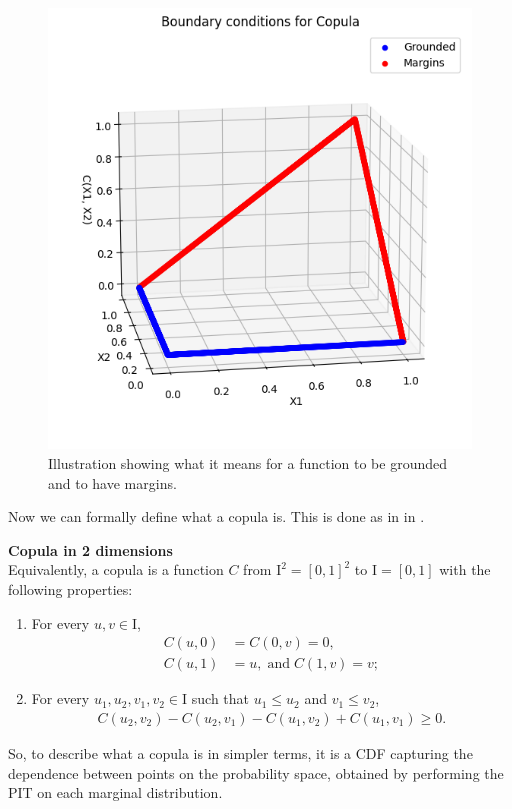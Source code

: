 \begin{figure}
    \centering
    \includegraphics[width=0.5\linewidth]{3Theory/pictures/MarginsAndGrounded.png}
    \caption{Illustration showing what it means for a function to be grounded and to have margins.}
    \label{fig:GroundedAndMargins}
\end{figure}

Now we can formally define what a copula is. This is done as in \citet[p.~10]{Nelsen2006} in .
\begin{definition}\label{def:copula}
            \textbf{Copula in 2 dimensions}\\
            Equivalently, a copula is a function $C$ from $\mathrm{I}^2=[0,1]^2$ to $\mathrm{I} = [0,1]$ with the following properties:
            \begin{enumerate}
                \item For every $u, v \in \mathrm{I}$,
                \begin{align*}
                    C(u,0) &= C(0,v) = 0,\\
                    C(u,1) &= u, \; \mathrm{and } \; C(1,v) = v;
                \end{align*}
                \item For every $u_1, u_2, v_1, v_2 \in \mathrm{I}$ such that $u_1 \leq u_2$ and $v_1 \leq v_2$,
                \begin{align*}
                    C(u_2,v_2) - C(u_2,v_1) - C(u_1,v_2) + C(u_1,v_1) \geq 0.
                \end{align*}
            \end{enumerate}
\end{definition}

So, to describe what a copula is in simpler terms, it is a \gls{CDF} capturing the dependence between points on the probability space, obtained by performing the \gls{PIT} on each marginal distribution. 

